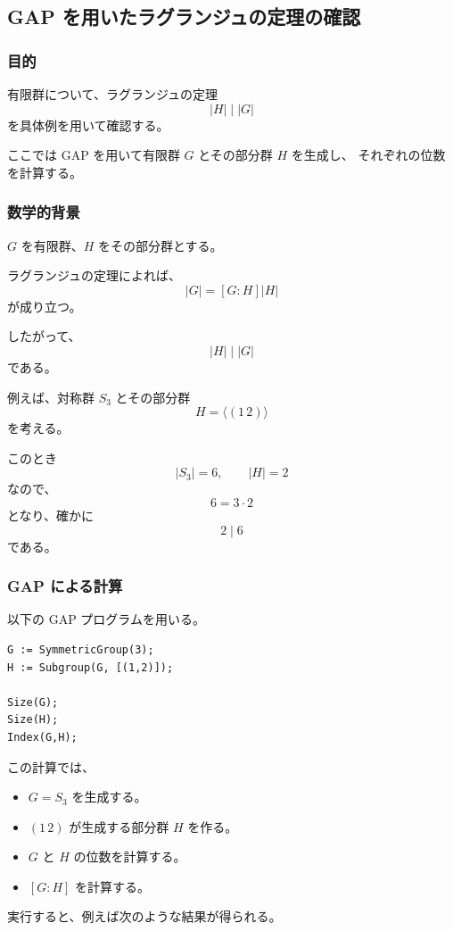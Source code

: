 \subsection{GAP を用いたラグランジュの定理の確認}

\subsubsection{目的}

有限群について、ラグランジュの定理
\[
|H| \mid |G|
\]
を具体例を用いて確認する。

ここでは GAP を用いて有限群 $G$ とその部分群 $H$ を生成し、
それぞれの位数を計算する。

\subsubsection{数学的背景}

$G$ を有限群、$H$ をその部分群とする。

ラグランジュの定理によれば、
\[
|G| = [G:H]|H|
\]
が成り立つ。

したがって、
\[
|H| \mid |G|
\]
である。

例えば、対称群 $S_3$ とその部分群
\[
H=\langle (1\,2)\rangle
\]
を考える。

このとき
\[
|S_3|=6,\qquad |H|=2
\]
なので、
\[
6=3\cdot2
\]
となり、確かに
\[
2\mid6
\]
である。

\subsubsection{GAP による計算}

以下の GAP プログラムを用いる。

\begin{lstlisting}[language={}]
G := SymmetricGroup(3);
H := Subgroup(G, [(1,2)]);

Size(G);
Size(H);
Index(G,H);
\end{lstlisting}

この計算では、

\begin{itemize}
  \item $G=S_3$ を生成する。
  \item $(1\,2)$ が生成する部分群 $H$ を作る。
  \item $G$ と $H$ の位数を計算する。
  \item $[G:H]$ を計算する。
\end{itemize}

実行すると、例えば次のような結果が得られる。


